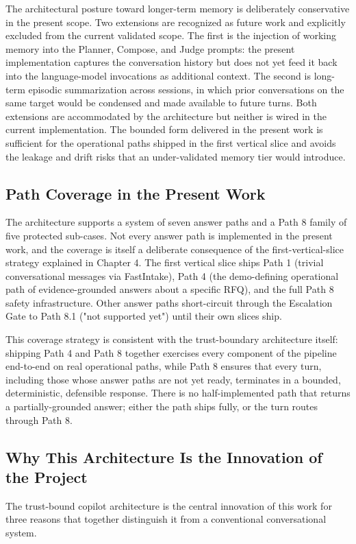 The architectural posture toward longer-term memory is deliberately conservative in the present scope. Two extensions are recognized as future work and explicitly excluded from the current validated scope. The first is the injection of working memory into the Planner, Compose, and Judge prompts: the present implementation captures the conversation history but does not yet feed it back into the language-model invocations as additional context. The second is long-term episodic summarization across sessions, in which prior conversations on the same target would be condensed and made available to future turns. Both extensions are accommodated by the architecture but neither is wired in the current implementation. The bounded form delivered in the present work is sufficient for the operational paths shipped in the first vertical slice and avoids the leakage and drift risks that an under-validated memory tier would introduce.

\subsection*{Path Coverage in the Present Work}
The architecture supports a system of seven answer paths and a Path 8 family of five protected sub-cases. Not every answer path is implemented in the present work, and the coverage is itself a deliberate consequence of the first-vertical-slice strategy explained in Chapter 4. The first vertical slice ships Path 1 (trivial conversational messages via FastIntake), Path 4 (the demo-defining operational path of evidence-grounded answers about a specific RFQ), and the full Path 8 safety infrastructure. Other answer paths short-circuit through the Escalation Gate to Path 8.1 ("not supported yet") until their own slices ship.

This coverage strategy is consistent with the trust-boundary architecture itself: shipping Path 4 and Path 8 together exercises every component of the pipeline end-to-end on real operational paths, while Path 8 ensures that every turn, including those whose answer paths are not yet ready, terminates in a bounded, deterministic, defensible response. There is no half-implemented path that returns a partially-grounded answer; either the path ships fully, or the turn routes through Path 8.

\subsection*{Why This Architecture Is the Innovation of the Project}
The trust-bound copilot architecture is the central innovation of this work for three reasons that together distinguish it from a conventional conversational system.

